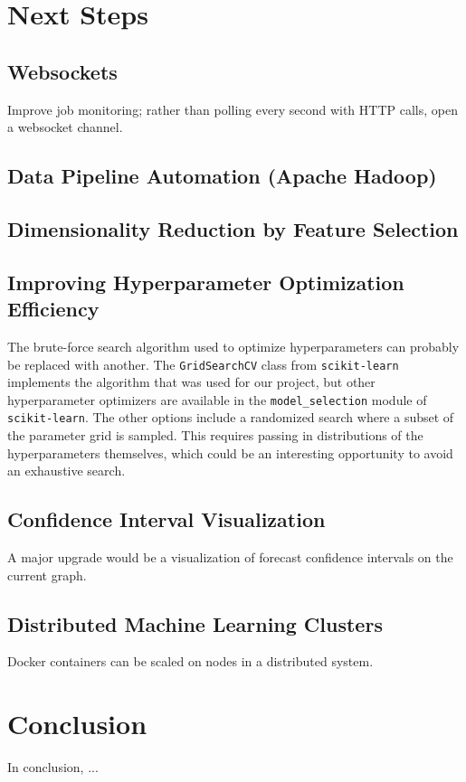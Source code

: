 \documentclass[11pt, oneside]{article}
\begin{document}
\section{Next Steps}
\subsection{Websockets}
Improve job monitoring; rather than polling every second with HTTP calls, open a websocket channel.
\subsection{Data Pipeline Automation (Apache Hadoop)}
\subsection{Dimensionality Reduction by Feature Selection}
\subsection{Improving Hyperparameter Optimization Efficiency}
  \label{improving_hyperparameter_optimization_efficiency}
  The brute-force search algorithm used to optimize hyperparameters can probably be replaced with another. The \texttt{GridSearchCV} class from \texttt{scikit-learn} implements the algorithm that was used for our project, but other hyperparameter optimizers are available in the \texttt{model\_selection} module of \texttt{scikit-learn}. The other options include a randomized search where a subset of the parameter grid is sampled. This requires passing in distributions of the hyperparameters themselves, which could be an interesting opportunity to avoid an exhaustive search.

\subsection{Confidence Interval Visualization}
A major upgrade would be a visualization of forecast confidence intervals on the current graph.

\subsection{Distributed Machine Learning Clusters}
\label{distributed_machine_learning_clusters}
Docker containers can be scaled on nodes in a distributed system.

\section{Conclusion}
In conclusion, ...
\end{document}
